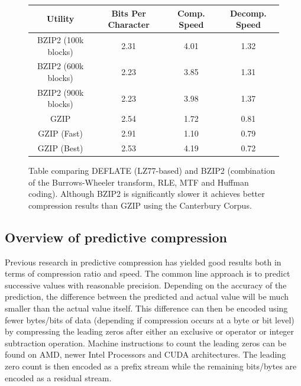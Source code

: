\begin{figure}[h!]
\begin{mdframed}
\centering
\begin{tabular}{|c|c|c|c|}
 \hline
 Utility & Bits Per Character & Comp. Speed & Decomp. Speed \\
 \hline
 BZIP2 (100k blocks) & 2.31 & 4.01  & 1.32 \\
 \hline
 BZIP2 (600k blocks) & 2.23 & 3.85 & 1.31 \\ 
 \hline
 BZIP2 (900k blocks) & 2.23 & 3.98  & 1.37 \\
 \hline
 GZIP & 2.54 & 1.72 & 0.81 \\
 \hline
 GZIP (Fast) & 2.91 & 1.10 & 0.79 \\
 \hline
 GZIP (Best) & 2.53 & 4.19 & 0.72 \\
 \hline
\end{tabular}
\caption[Speed and compression performance comparison of GZIP and BZIP2 using the Canterbury Corpus]{Table comparing DEFLATE (LZ77-based) and BZIP2 (combination of the Burrows-Wheeler transform, RLE, MTF and Huffman coding). Although BZIP2 is significantly slower
it achieves better compression results than GZIP using the Canterbury Corpus.}
\label{BZIP2_VS_GZIP}
\end{mdframed}
\end{figure}

\subsection{Overview of predictive compression}
Previous research \cite{1607248,4589203,engelson2000lossless,lindstrom2006fast,O'Neil:2011:FDC:1964179.1964189,4976448,CGF:CGF681} in predictive compression has yielded good results both in terms of compression ratio and speed. 
The common line approach is to predict successive values with reasonable precision. Depending on the accuracy of the prediction, the difference between the predicted and actual value will be much smaller than the actual value itself. 
This difference can then be encoded using fewer bytes/bits of data (depending if compression occurs at a byte or bit level) by compressing the leading zeros after either an exclusive or operator or integer subtraction 
operation. Machine instructions to count the leading zeros can be found on AMD, newer Intel Processors and CUDA architectures. The leading zero count is then encoded as a prefix stream while the remaining bits/bytes 
are encoded as a residual stream.

